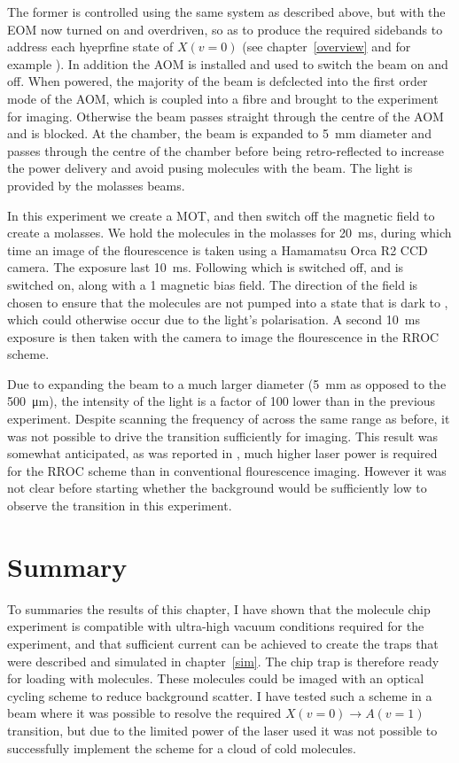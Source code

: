 The former is controlled using the same system as described above, but with the
EOM now turned on and overdriven, so as to produce the required sidebands to
address each hyeprfine state of $X(v=0)$ (see chapter~\ref{overview} and for
example ). In addition the AOM is installed and used to
switch the beam on and off. When powered, the majority of the beam is
defclected into the first order mode of the AOM, which is coupled into a fibre
and brought to the experiment for imaging. Otherwise the beam passes straight
through the centre of the AOM and is blocked. At the chamber, the beam is
expanded to \SI{5}{\milli\meter} diameter and passes through the centre of the
chamber before being retro-reflected to increase the power delivery and avoid
pusing molecules with the beam. 
%
The  light is provided by the molasses beams.

In this experiment we create a MOT, and then switch off the magnetic field to
create a molasses. We hold the molecules in the molasses for
\SI{20}{\milli\second}, during which time an image of the flourescence is taken
using a Hamamatsu Orca R2 CCD camera.
The exposure last \SI{10}{\milli\second}. Following which  is
switched off, and  is switched on, along with a \SI{1}{\gauss}
magnetic bias field.  The direction of the field is chosen to ensure that the
molecules are not pumped into a state that is dark to , which
could otherwise occur due to the light's polarisation. A second
\SI{10}{\milli\second} exposure is then taken with the camera to image the
flourescence in the RROC scheme.

Due to expanding the beam to a much larger diameter (\SI{5}{\milli\meter} as
opposed to the \SI{500}{\micro\meter}), the intensity of the light is a factor
of 100 lower than in the previous experiment. Despite scanning the frequency of
 across the same range as before, it was not possible to drive the
transition sufficiently for imaging. This result was somewhat anticipated, as
was reported in , much higher laser power is required for
the RROC scheme than in conventional flourescence imaging. However it was
not clear before starting whether the background would be sufficiently low to
observe the transition in this experiment.

\section{Summary}

To summaries the results of this chapter, I have shown that the molecule chip
experiment is compatible with ultra-high vacuum conditions required for the
\CaF{} experiment, and that sufficient current can be achieved to create the
traps that were described and simulated in chapter~\ref{sim}. The chip trap is
therefore ready for loading with \CaF{} molecules. These molecules could be
imaged with an optical cycling scheme to reduce background scatter. I have
tested such a scheme in a \CaF{} beam where it was possible to resolve the
required $X(v=0)\rightarrow A(v=1)$ transition, but due to the limited power of
the laser used it was not possible to successfully implement the scheme for a
cloud of cold molecules.
